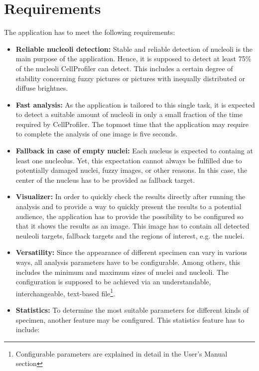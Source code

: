 \documentclass[a4paper, 12pt]{article}
\begin{document}
\section{Requirements}\label{sec:requirements}
The application has to meet the following requirements:
\begin{itemize}
  \item \textbf{Reliable nucleoli detection:} Stable and reliable detection of
  nucleoli is the main purpose of the application. Hence, it is supposed to
  detect at least 75\% of the nucleoli CellProfiler can detect. This includes
  a certain degree of stability concerning fuzzy pictures or pictures with
  inequally distributed or diffuse brightnes.
  \item \textbf{Fast analysis:} As the application is tailored to this single
  task, it is expected to detect a suitable amount of nucleoli in only a small
  fraction of the time required by CellProfiler. The topmost time that the
  application may require to complete the analysis of one image is five seconds.
  \item \textbf{Fallback in case of empty nuclei:} Each nucleus is expected to
  containg at least one nucleolus. Yet, this expectation cannot always be
  fulfilled due to potentially damaged nuclei, fuzzy images, or other reasons.
  In this case, the center of the nucleus has to be provided as fallback target.
  \item \textbf{Visualizer:} In order to quickly check the results directly
  after running the analysis and to provide a way to quickly present the results
  to a potential audience, the application has to provide the possibility to be
  configured so that it shows the results as an image. This image has to contain
  all detected neuleoli targets, fallback targets and the regions of interest,
  e.g. the nuclei.
  \item \textbf{Versatility:} Since the appearance of different specimen can
  vary in various ways, all analysis parameters have to be configurable. Among
  others, this includes the minimum and maximum sizes of nuclei and nucleoli.
  The configuration is supposed to be achieved via an understandable,
  interchangeable, text-based file\footnote{Configurable parameters are
  explained in detail in the User's Manual section}.
  \item \textbf{Statistics:} To determine the most suitable parameters for
  different kinds of specimen, another feature may be configured. This
  statistics feature has to include:
  \begin{itemize}

\end{itemize}
\end{itemize}
\end{document}

